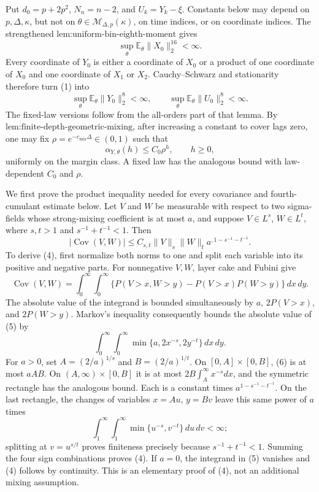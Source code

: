 Put \(d_0=p+2p^2\), \(N_n=n-2\), and \(U_k=Y_k-\xi\).  Constants below may depend on \(p,\Delta,\kappa\), but not on \(\theta\in\mathcal M_{\Delta,p}(\kappa)\), on time indices, or on coordinate indices.  The strengthened \(\text{lem:uniform-bin-eighth-moment}\) gives
\[
 \sup_\theta\mathbb E_\theta\lVert X_0\rVert_2^{16}<\infty.
\tag{1}
\]
Every coordinate of \(Y_0\) is either a coordinate of \(X_0\) or a product of one coordinate of \(X_0\) and one coordinate of \(X_1\) or \(X_2\).  Cauchy--Schwarz and stationarity therefore turn (1) into
\[
 \sup_\theta\mathbb E_\theta\lVert Y_0\rVert_2^8<\infty,
 \qquad
 \sup_\theta\mathbb E_\theta\lVert U_0\rVert_2^8<\infty.
\tag{2}
\]
The fixed-law versions follow from the all-orders part of that lemma.  By \(\text{lem:finite-depth-geometric-mixing}\), after increasing a constant to cover lags zero, one may fix \(\rho=e^{-c_{\mathrm{mix}}\Delta}\in(0,1)\) such that
\[
 \alpha_{Y,\theta}(h)\leq C_0\rho^h,
 \qquad h\geq0,
\tag{3}
\]
uniformly on the margin class.  A fixed law has the analogous bound with law-dependent \(C_0\) and \(\rho\).

We first prove the product inequality needed for every covariance and fourth-cumulant estimate below.  Let \(V\) and \(W\) be measurable with respect to two sigma-fields whose strong-mixing coefficient is at most \(a\), and suppose \(V\in L^s\), \(W\in L^t\), where \(s,t>1\) and \(s^{-1}+t^{-1}<1\).  Then
\[
 |\operatorname{Cov}(V,W)|
 \leq C_{s,t}\lVert V\rVert_s\lVert W\rVert_t
 a^{,1-s^{-1}-t^{-1}}.
\tag{4}
\]
To derive (4), first normalize both norms to one and split each variable into its positive and negative parts.  For nonnegative \(V,W\), layer cake and Fubini give
\[
 \operatorname{Cov}(V,W)=
 \int_0^\infty\!\int_0^\infty
 \{P(V>x,W>y)-P(V>x)P(W>y)\}\,dx\,dy.
\tag{5}
\]
The absolute value of the integrand is bounded simultaneously by \(a\), \(2P(V>x)\), and \(2P(W>y)\).  Markov's inequality consequently bounds the absolute value of (5) by
\[
 \int_0^\infty\!\int_0^\infty
 \min\{a,2x^{-s},2y^{-t}\}\,dx\,dy.
\tag{6}
\]
For \(a>0\), set \(A=(2/a)^{1/s}\) and \(B=(2/a)^{1/t}\).  On \([0,A]\times[0,B]\), (6) is at most \(aAB\).  On \((A,\infty)\times[0,B]\) it is at most \(2B\int_A^\infty x^{-s}dx\), and the symmetric rectangle has the analogous bound.  Each is a constant times \(a^{1-s^{-1}-t^{-1}}\).  On the last rectangle, the changes of variables \(x=Au\), \(y=Bv\) leave this same power of \(a\) times
\[
 \int_1^\infty\!\int_1^\infty\min\{u^{-s},v^{-t}\}\,du\,dv<\infty;
\tag{7}
\]
splitting at \(v=u^{s/t}\) proves finiteness precisely because \(s^{-1}+t^{-1}<1\).  Summing the four sign combinations proves (4).  If \(a=0\), the integrand in (5) vanishes and (4) follows by continuity.  This is an elementary proof of (4), not an additional mixing assumption.

